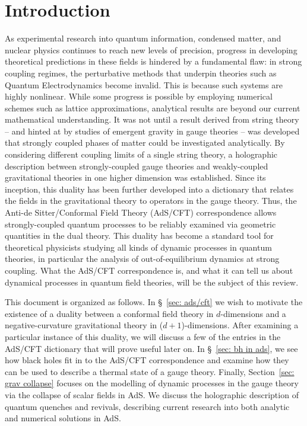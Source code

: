 \documentclass[../PhD.tex]{subfiles}
\begin{document}

\chapter{Introduction}
\label{ch: intro}

As experimental research into quantum information, condensed matter, and nuclear physics continues to reach new levels of precision, progress in developing theoretical predictions in these fields is hindered by a fundamental flaw: in strong coupling regimes, the perturbative methods that underpin theories such as Quantum Electrodynamics become invalid. This is because such systems are highly nonlinear. While some progress is possible by employing numerical schemes such as lattice approximations, analytical results are beyond our current mathematical understanding. It was not until a result derived from string theory -- and hinted at by studies of emergent gravity in gauge theories -- was developed that  strongly coupled phases of matter could be investigated analytically. By considering different coupling limits of a single string theory, a holographic description between strongly-coupled gauge theories and weakly-coupled gravitational theories in one higher dimension was established. Since its inception, this duality has been further developed into a dictionary that relates the fields in the gravitational theory to operators in the gauge theory. Thus, the Anti-de Sitter/Conformal Field Theory (AdS/CFT) correspondence allows strongly-coupled quantum processes to be reliably examined via geometric quantities in the dual theory. This duality has become a standard tool for theoretical physicists studying all kinds of dynamic processes in quantum theories, in particular the analysis of out-of-equilibrium dynamics at strong coupling. What the AdS/CFT correspondence is, and what it can tell us about dynamical processes in quantum field theories, will be the subject of this review.

This document is organized as follows. In \S~\!\ref{sec: ads/cft} we wish to motivate the existence of a duality between a conformal field theory in $d$-dimensions and a negative-curvature gravitational theory in ($d + 1$)-dimensions. After examining a particular instance of this duality, we will discuss a few of the entries in the AdS/CFT dictionary that will prove useful later on. In \S~\!\ref{sec: bh in ads}, we see how black holes fit in to the AdS/CFT correspondence and examine how they can be used to describe a thermal state of a gauge theory. Finally, Section~\ref{sec: grav collapse} focuses on the modelling of dynamic processes in the gauge theory via the collapse of scalar fields in AdS. We discuss the holographic description of quantum quenches and revivals, describing current research into both analytic and numerical solutions in AdS.
\end{document}
